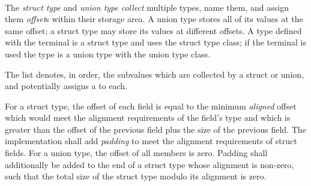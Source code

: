 \begin{grammar}
 \\
	  \terminal{\{}  \terminal{\}} \\
	 \terminal{\{}  \terminal{\}} \\

 \\
	 \optional{\terminal{,}} \\
	 \terminal{,}  \\

 \\
	  \terminal{:}  \\
	  \\
	  \\

 \\
	 \terminal{(}  \terminal{)}
\end{grammar}

\specsubsubitem
The \textit{struct type} and \textit{union type} \textit{collect} multiple
types, name them, and assign them \textit{offset}s within their storage area. A
union type stores all of its values at the same offset; a struct type may store
its values at different offsets. A type defined with the 
terminal is a struct type and uses the struct type class; if the
 terminal is used the type is a union type with the union type
class.

\specsubsubitem
The  list denotes, in order, the subvalues
which are collected by a struct or union, and potentially assigns a
 to each.

\specsubsubitem
For a struct type, the offset of each field is equal to the minimum
\textit{aligned} offset which would meet the alignment requirements of the
field's type and which is greater than the offset of the previous field plus the
size of the previous field. The implementation shall add \textit{padding} to
meet the alignment requirements of struct fields. For a union type, the offset
of all members is zero. Padding shall additionally be added to the end of a
struct type whose alignment is non-zero, such that the total size of the struct
type modulo its alignment is zero.

